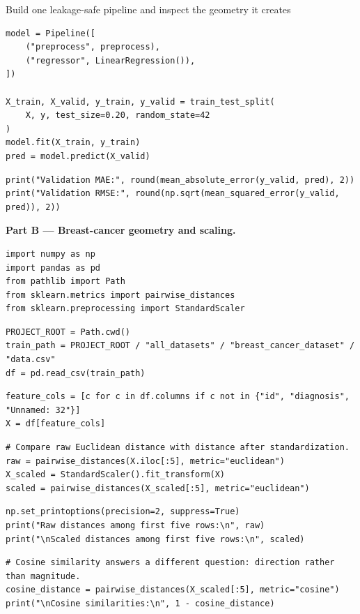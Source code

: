 \begin{labproject}{Build one leakage-safe pipeline and inspect the geometry it creates}
\begin{lstlisting}[style=mlpython]
model = Pipeline([
    ("preprocess", preprocess),
    ("regressor", LinearRegression()),
])

X_train, X_valid, y_train, y_valid = train_test_split(
    X, y, test_size=0.20, random_state=42
)
model.fit(X_train, y_train)
pred = model.predict(X_valid)
\end{lstlisting}

\begin{lstlisting}[style=mlpython]
print("Validation MAE:", round(mean_absolute_error(y_valid, pred), 2))
print("Validation RMSE:", round(np.sqrt(mean_squared_error(y_valid, pred)), 2))
\end{lstlisting}

\medskip\noindent\textbf{Part B --- Breast-cancer geometry and scaling.}\par
\begin{lstlisting}[style=mlpython]
import numpy as np
import pandas as pd
from pathlib import Path
from sklearn.metrics import pairwise_distances
from sklearn.preprocessing import StandardScaler
\end{lstlisting}

\begin{lstlisting}[style=mlpython]
PROJECT_ROOT = Path.cwd()
train_path = PROJECT_ROOT / "all_datasets" / "breast_cancer_dataset" / "data.csv"
df = pd.read_csv(train_path)
\end{lstlisting}

\begin{lstlisting}[style=mlpython]
feature_cols = [c for c in df.columns if c not in {"id", "diagnosis", "Unnamed: 32"}]
X = df[feature_cols]
\end{lstlisting}

\begin{lstlisting}[style=mlpython]
# Compare raw Euclidean distance with distance after standardization.
raw = pairwise_distances(X.iloc[:5], metric="euclidean")
X_scaled = StandardScaler().fit_transform(X)
scaled = pairwise_distances(X_scaled[:5], metric="euclidean")
\end{lstlisting}

\begin{lstlisting}[style=mlpython]
np.set_printoptions(precision=2, suppress=True)
print("Raw distances among first five rows:\n", raw)
print("\nScaled distances among first five rows:\n", scaled)
\end{lstlisting}

\begin{lstlisting}[style=mlpython]
# Cosine similarity answers a different question: direction rather than magnitude.
cosine_distance = pairwise_distances(X_scaled[:5], metric="cosine")
print("\nCosine similarities:\n", 1 - cosine_distance)
\end{lstlisting}


\end{labproject}
